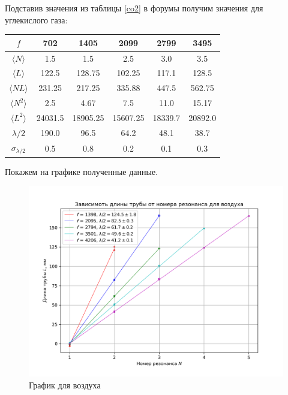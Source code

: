 \documentclass[a4paper,12pt]{article} %
\begin{document}
Подставив значения из таблицы \ref{co2} в форумы получим значения для углекислого газа:


\begin{center}
\begin{tabular}{|c|c|c|c|c|c|}
\hline 
$f$ & 702 & 1405 & 2099 & 2799 & 3495 \\ 
\hline 
$\langle N \rangle$ & 1.5 & 1.5 & 2.5 & 3.0 & 3.5 \\ 
\hline 
$\langle L \rangle$ & 122.5 & 128.75 & 102.25 & 117.1 & 128.5 \\ 
\hline 
$\langle NL \rangle$ & 231.25 & 217.25 & 335.88 & 447.5 & 562.75 \\ 
\hline 
$\langle N^2 \rangle$ & 2.5 & 4.67 & 7.5 & 11.0 &  15.17 \\ 
\hline 
$\langle L^2 \rangle$ & 24031.5 & 18905.25 & 15607.25 & 18339.7 & 20892.0 \\ 
\hline 
$\lambda/2$ & 190.0 & 96.5 & 64.2 & 48.1 & 38.7 \\ 
\hline 
$\sigma_{\lambda/2}$ & 0.5 & 0.8 & 0.2 & 0.1 & 0.3 \\ 
\hline 
\end{tabular} 
\end{center}


Покажем на графике полученные данные.

\begin{figure}[h]
\begin{center}
\includegraphics[width=\textwidth]{plot1.png}
\end{center}
\caption{График для воздуха}
\label{fig:plot1}
\end{figure}
\end{document}
